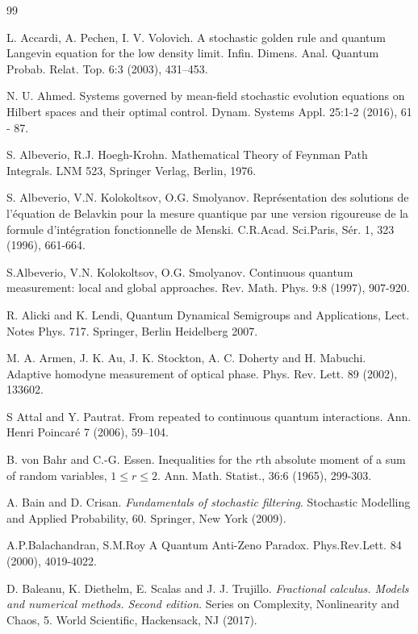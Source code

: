 \documentclass[12pt]{article}
\begin{document}
 \begin{thebibliography}{99}

L. Accardi, A. Pechen, I. V. Volovich. A stochastic golden rule and quantum Langevin equation for the low density limit.
Infin. Dimens. Anal. Quantum Probab. Relat. Top. 6:3 (2003), 431–453.

N. U. Ahmed. Systems governed by mean-field stochastic evolution equations on Hilbert spaces and their optimal control.
Dynam. Systems Appl. 25:1-2 (2016), 61 - 87.

 S. Albeverio, R.J. Hoegh-Krohn. Mathematical Theory of Feynman Path
Integrals. LNM 523, Springer Verlag, Berlin, 1976.

S. Albeverio, V.N. Kolokoltsov, O.G. Smolyanov. Repr\'esentation des
solutions de l'\'equation de Belavkin pour la mesure quantique par une version
rigoureuse de la formule d'int\'egration fonctionnelle de Menski.
C.R.Acad. Sci.Paris, S\'er. 1, 323 (1996), 661-664.

  S.Albeverio, V.N. Kolokoltsov,
O.G. Smolyanov. Continuous quantum measurement: local and
global approaches.
 Rev. Math. Phys. 9:8 (1997), 907-920.

R. Alicki and K. Lendi, Quantum Dynamical Semigroups and Applications, Lect. Notes
Phys. 717. Springer, Berlin Heidelberg 2007.

M. A. Armen, J. K. Au, J. K. Stockton, A. C. Doherty and H. Mabuchi. Adaptive homodyne measurement
 of optical phase. Phys. Rev. Lett. 89 (2002), 133602.


S Attal and Y. Pautrat. From repeated to continuous quantum interactions.
Ann. Henri Poincar\'e 7 (2006), 59--104.

B. von Bahr and C.-G. Essen.
Inequalities for the $r$th absolute moment of a sum of random variables, $1\le r\le 2$.
 Ann. Math. Statist., 36:6 (1965),  299-303.

A. Bain and D. Crisan.  \emph{Fundamentals of stochastic filtering}. Stochastic Modelling and Applied Probability, 60.
Springer, New York (2009).

A.P.Balachandran, S.M.Roy
A Quantum Anti-Zeno Paradox.
Phys.Rev.Lett. 84 (2000), 4019-4022.

D. Baleanu, K. Diethelm, E. Scalas and J. J.  Trujillo.  \emph{Fractional calculus.
Models and numerical methods. Second edition}.
 Series on Complexity, Nonlinearity and Chaos, 5. World Scientific, Hackensack, NJ (2017).


\end{thebibliography}
\end{document}
